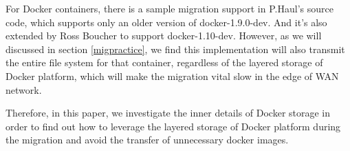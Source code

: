 For Docker containers, there is a sample migration support in P.Haul's source code, which supports only an older version of docker-1.9.0-dev. And it's also extended by Ross Boucher to support docker-1.10-dev. However, as we will discussed in section \ref{migpractice}, we find this implementation will also transmit the entire file system for that container, regardless of the layered storage of Docker platform, which will make the migration vital slow in the edge of WAN network. 

Therefore, in this paper, we investigate the inner details of Docker storage in order to find out how to leverage the layered storage of Docker platform during the migration and avoid the transfer of unnecessary docker images. 



